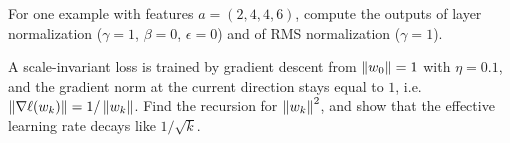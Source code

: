 \begin{notechapter}
\begin{exercise}\label{normalization:exr:4}
For one example with features $a = (2, 4, 4, 6)$, compute the outputs of layer normalization
($\gamma = 1$, $\beta = 0$, $\epsilon = 0$) and of RMS normalization ($\gamma = 1$).
\end{exercise}

\begin{exercise}\label{normalization:exr:5}
A scale-invariant loss is trained by gradient descent from $\left\|w_0\right\| = 1$ with $\eta = 0.1$, and the gradient norm at
the current direction stays equal to $1$, i.e.\ $\left\|\nabla\ell(w_k)\right\| = 1/\left\|w_k\right\|$. Find the recursion for $\left\|w_k\right\|^2$, and show that
the effective learning rate decays like $1/\sqrt k$.
\end{exercise}
\end{notechapter}
